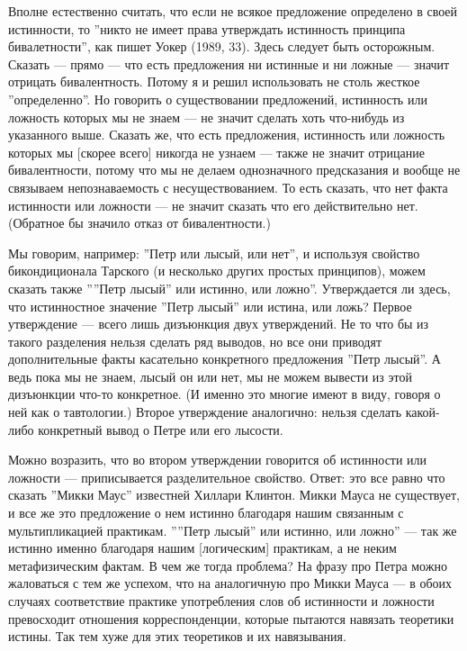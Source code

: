 \documentclass[11pt]{book}
\begin{document}
Вполне естественно считать, что если не всякое предложение определено в своей истинности, то ''никто не имеет права утверждать истинность принципа бивалетности'', как пишет Уокер (1989, 33). Здесь следует быть осторожным. Сказать --- прямо --- что есть предложения ни истинные и ни ложные --- значит отрицать бивалентность. Потому я и решил использовать не столь жесткое ''определенно''. Но говорить о существовании предложений, истинность или ложность которых мы не знаем --- не значит сделать хоть что-нибудь из указанного выше. Сказать же, что есть предложения, истинность или ложность которых мы [скорее всего] никогда не узнаем --- также не значит отрицание бивалентности, потому что мы не делаем однозначного предсказания и вообще не связываем непознаваемость с несуществованием. То есть сказать, что нет факта истинности или ложности --- не значит сказать что его действительно нет. (Обратное бы значило отказ от бивалентности.)

Мы говорим, например: ''Петр или лысый, или нет'', и используя свойство бикондиционала Тарского (и несколько других простых принципов), можем сказать также ''''Петр лысый'' или истинно, или ложно''. Утверждается ли здесь, что истинностное значение ''Петр лысый'' или истина, или ложь? Первое утверждение --- всего лишь дизъюнкция двух утверждений. Не то что бы из такого разделения нельзя сделать ряд выводов, но все они приводят дополнительные факты касательно конкретного предложения ''Петр лысый''. А ведь пока мы не знаем, лысый он или нет, мы не можем вывести из этой дизъюнкции что-то конкретное. (И именно это многие имеют в виду, говоря о ней как о тавтологии.) Второе утверждение аналогично: нельзя сделать какой-либо конкретный вывод о Петре или его лысости.

Можно возразить, что во втором утверждении говорится об истинности или ложности --- приписывается разделительное свойство. Ответ: это все равно что сказать ''Микки Маус'' известней Хиллари Клинтон. Микки Мауса не существует, и все же это предложение о нем истинно благодаря нашим связанным с мультипликацией практикам. ''''Петр лысый'' или истинно, или ложно'' --- так же истинно именно благодаря нашим [логическим] практикам, а не неким метафизическим фактам. В чем же тогда проблема? На фразу про Петра можно жаловаться с тем же успехом, что на аналогичную про Микки Мауса --- в обоих случаях соответствие практике употребления слов об истинности и ложности превосходит отношения корреспонденции, которые пытаются навязать теоретики истины. Так тем хуже для этих теоретиков и их навязывания.
\end{document}
